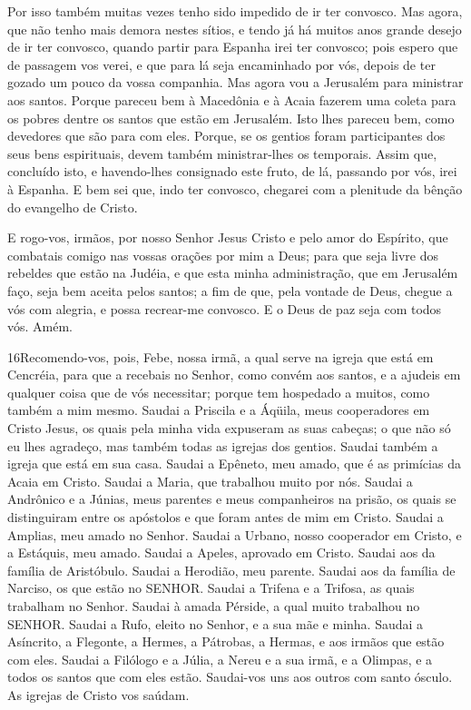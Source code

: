Por isso também muitas vezes tenho sido impedido de ir ter
convosco. Mas agora, que não tenho mais demora nestes sítios,
e tendo já há muitos anos grande desejo de ir ter convosco,
quando partir para Espanha irei ter convosco; pois espero que
de passagem vos verei, e que para lá seja encaminhado por vós,
depois de ter gozado um pouco da vossa companhia. Mas agora
vou a Jerusalém para ministrar aos santos. Porque pareceu bem
à Macedônia e à Acaia fazerem uma coleta para os pobres dentre os
santos que estão em Jerusalém. Isto lhes pareceu bem, como
devedores que são para com eles. Porque, se os gentios foram
participantes dos seus bens espirituais, devem também ministrar-lhes
os temporais. Assim que, concluído isto, e havendo-lhes
consignado este fruto, de lá, passando por vós, irei à Espanha.
E bem sei que, indo ter convosco, chegarei com a plenitude da
bênção do evangelho de Cristo.

E rogo-vos, irmãos, por nosso Senhor Jesus Cristo e pelo amor do
Espírito, que combatais comigo nas vossas orações por mim a Deus;
para que seja livre dos rebeldes que estão na Judéia, e que
esta minha administração, que em Jerusalém faço, seja bem aceita
pelos santos; a fim de que, pela vontade de Deus, chegue a
vós com alegria, e possa recrear-me convosco. E o Deus de paz
seja com todos vós. Amém.

\medskip

\lettrine{16} Recomendo-vos, pois, Febe, nossa irmã, a qual
serve na igreja que está em Cencréia, para que a recebais no
Senhor, como convém aos santos, e a ajudeis em qualquer coisa que de
vós necessitar; porque tem hospedado a muitos, como também a mim
mesmo. Saudai a Priscila e a Áqüila, meus cooperadores em Cristo
Jesus, os quais pela minha vida expuseram as suas cabeças; o que
não só eu lhes agradeço, mas também todas as igrejas dos gentios.
Saudai também a igreja que está em sua casa. Saudai a Epêneto,
meu amado, que é as primícias da Acaia em Cristo. Saudai a
Maria, que trabalhou muito por nós. Saudai a Andrônico e a
Júnias, meus parentes e meus companheiros na prisão, os quais se
distinguiram entre os apóstolos e que foram antes de mim em Cristo.
Saudai a Amplias, meu amado no Senhor. Saudai a Urbano,
nosso cooperador em Cristo, e a Estáquis, meu amado. Saudai a
Apeles, aprovado em Cristo. Saudai aos da família de Aristóbulo.
Saudai a Herodião, meu parente. Saudai aos da família de
Narciso, os que estão no SENHOR. Saudai a Trifena e a
Trifosa, as quais trabalham no Senhor. Saudai à amada Pérside, a
qual muito trabalhou no SENHOR. Saudai a Rufo, eleito no
Senhor, e a sua mãe e minha. Saudai a Asíncrito, a Flegonte,
a Hermes, a Pátrobas, a Hermas, e aos irmãos que estão com eles.
Saudai a Filólogo e a Júlia, a Nereu e a sua irmã, e a
Olimpas, e a todos os santos que com eles estão. Saudai-vos
uns aos outros com santo ósculo. As igrejas de Cristo vos saúdam.


